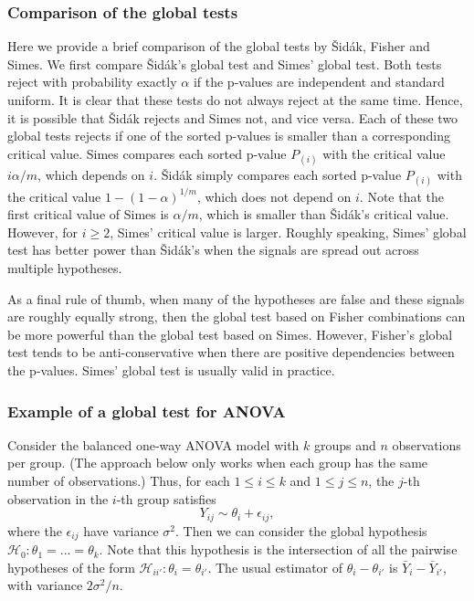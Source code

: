 \documentclass[11pt]{article}
\theoremstyle{plain}
\theoremstyle{definition}
\newcommand{\Hy}{\mathcal{H}}
\begin{document}
\subsubsection{Comparison of the global tests}
Here we provide a brief comparison of the global tests by \v{S}id\'{a}k, Fisher and Simes.
We first compare \v{S}id\'{a}k's global test and Simes' global test. Both tests reject with probability exactly $\alpha$ if the p-values are independent and standard uniform. It is clear that these tests do not always reject at the same time. Hence, it is possible that \v{S}id\'{a}k rejects and Simes not, and vice versa.
Each of these two global tests rejects if one of the sorted p-values is smaller than a corresponding critical value.  Simes compares each sorted p-value $P_{(i)}$ with the critical value $i\alpha/m$, which depends on $i$.  \v{S}id\'{a}k simply compares each sorted p-value $P_{(i)}$ with the critical value $1-(1-\alpha)^{1/m}$, which does not depend on $i$.
Note that the first critical value of Simes is $\alpha/m$, which is smaller than \v{S}id\'{a}k's critical value. However, for $i\geq 2$, Simes' critical value is larger. Roughly speaking, Simes' global test has better power than \v{S}id\'{a}k's when the signals are spread out across multiple hypotheses.

As a final rule of thumb, when many of the hypotheses are false and these signals are roughly equally strong, then the global test based on Fisher combinations can be more powerful than the global test based on Simes. However, Fisher's global test tends to be anti-conservative when there are positive dependencies between the p-values. Simes' global test is usually valid in practice.













\subsubsection{Example of a global test for ANOVA} \label{secglobalanova}
Consider the balanced one-way ANOVA model with $k$ groups and $n$ observations per group. (The approach below only works when each group has the same number of observations.)
Thus, for each $1\leq i \leq k$ and $1\leq j \leq n$, the $j$-th observation in the $i$-th group satisfies 
$$Y_{ij} \sim \theta_i +\epsilon_{ij},$$
where the $\epsilon_{ij}$ have variance $\sigma^2$. Then we can consider the global hypothesis $\Hy_0:\theta_1=...=\theta_k$. Note that this hypothesis is the intersection of all the pairwise hypotheses of the form $\Hy_{ii'}: \theta_i=\theta_{i'}$.
The usual estimator of  $\theta_i-\theta_{i'}$ is $\bar{Y}_{i} - \bar{Y}_{i'}$, with variance $2\sigma^2/n$.
\end{document}
